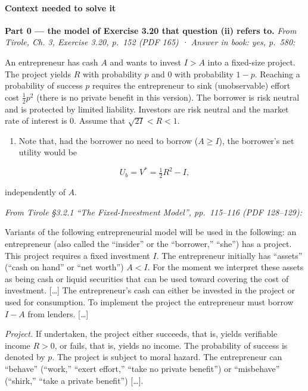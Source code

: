 \documentclass[11pt,a4paper]{article}
\providecommand{\tightlist}{\setlength{\itemsep}{0pt}\setlength{\parskip}{0pt}}
\begin{document}
\paragraph{Context needed to solve it}

\textbf{Part 0 --- the model of Exercise 3.20 that question (ii) refers to.} \emph{From Tirole, Ch.
3, Exercise 3.20, p.~152 (PDF 165) · Answer in book: yes, p.~580:}

An entrepreneur has cash \(A\) and wants to invest \(I > A\) into a fixed-size project. The project
yields \(R\) with probability \(p\) and 0 with probability \(1 - p\). Reaching a probability of
success \(p\) requires the entrepreneur to sink (unobservable) effort cost \(\frac{1}{2}p^2\) (there
is no private benefit in this version). The borrower is risk neutral and is protected by limited
liability. Investors are risk neutral and the market rate of interest is 0. Assume that
\(\sqrt{2I} < R < 1\).

\begin{enumerate}
\def\labelenumi{(\roman{enumi})}
\tightlist
\item
  Note that, had the borrower no need to borrow (\(A \geqslant I\)), the borrower's net utility
  would be
\end{enumerate}

\[U_b = V^* = \tfrac{1}{2}R^2 - I,\]

independently of \(A\).

\emph{From Tirole §3.2.1 ``The Fixed-Investment Model'', pp.~115--116 (PDF 128--129):}

Variants of the following entrepreneurial model will be used in the following: an entrepreneur (also
called the ``insider'' or the ``borrower,'' ``she'') has a project. This project requires a fixed
investment \(I\). The entrepreneur initially has ``assets'' (``cash on hand'' or ``net worth'')
\(A < I\). For the moment we interpret these assets as being cash or liquid securities that can be
used toward covering the cost of investment. {[}\ldots{]} The entrepreneur's cash can either be
invested in the project or used for consumption. To implement the project the entrepreneur must
borrow \(I - A\) from lenders. {[}\ldots{]}

\emph{Project.} If undertaken, the project either succeeds, that is, yields verifiable income
\(R > 0\), or fails, that is, yields no income. The probability of success is denoted by \(p\). The
project is subject to moral hazard. The entrepreneur can ``behave'' (``work,'' ``exert effort,''
``take no private benefit'') or ``misbehave'' (``shirk,'' ``take a private benefit'') {[}\ldots{]}.
\end{document}
